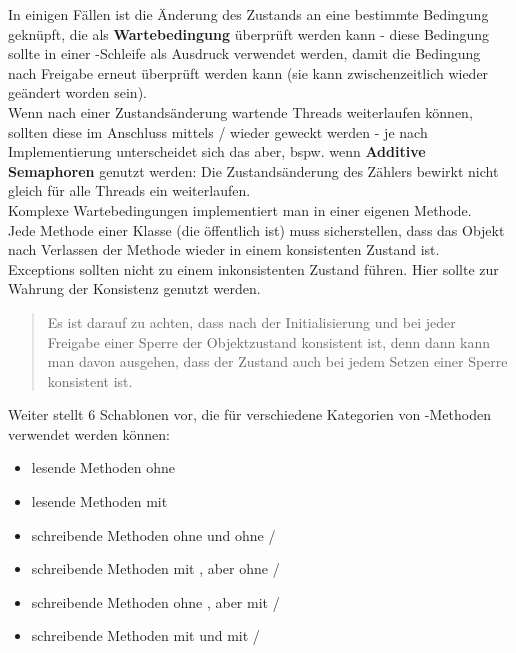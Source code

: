 \noindent
In einigen Fällen ist die Änderung des Zustands an eine bestimmte Bedingung geknüpft, die als \textbf{Wartebedingung} überprüft werden kann - diese Bedingung sollte in einer -Schleife als Ausdruck verwendet werden, damit die Bedingung nach Freigabe erneut überprüft werden kann (sie kann zwischenzeitlich wieder geändert worden sein).\\

\noindent
Wenn nach einer Zustandsänderung wartende Threads weiterlaufen können, sollten diese im Anschluss mittels / wieder geweckt werden - je nach Implementierung unterscheidet sich das aber, bspw. wenn \textbf{Additive Semaphoren} genutzt werden: Die Zustandsänderung des Zählers bewirkt nicht gleich für alle Threads ein weiterlaufen.\\

\noindent
Komplexe Wartebedingungen implementiert man in einer eigenen Methode.\\

\noindent
Jede Methode einer Klasse (die öffentlich ist) muss sicherstellen, dass das Objekt nach Verlassen der Methode wieder in einem konsistenten Zustand ist.\\

\noindent
Exceptions sollten nicht zu einem inkonsistenten Zustand führen. Hier sollte  zur Wahrung der Konsistenz genutzt werden.

\blockquote[{\cite[142]{Oec22}}]{
Es ist darauf zu achten, dass nach der Initialisierung und bei jeder Freigabe einer Sperre der Objektzustand konsistent ist, denn dann kann man davon ausgehen, dass der Zustand auch bei jedem Setzen einer Sperre konsistent ist.
}

Weiter stellt \cite{Oec22} 6 Schablonen vor, die für verschiedene Kategorien von -Methoden verwendet werden können:

\begin{itemize}
    \item lesende Methoden ohne 
    \item lesende Methoden mit 
    \item schreibende Methoden ohne  und ohne /
    \item schreibende Methoden mit , aber ohne /
    \item schreibende Methoden ohne , aber mit /
    \item schreibende Methoden mit  und mit /
\end{itemize}



